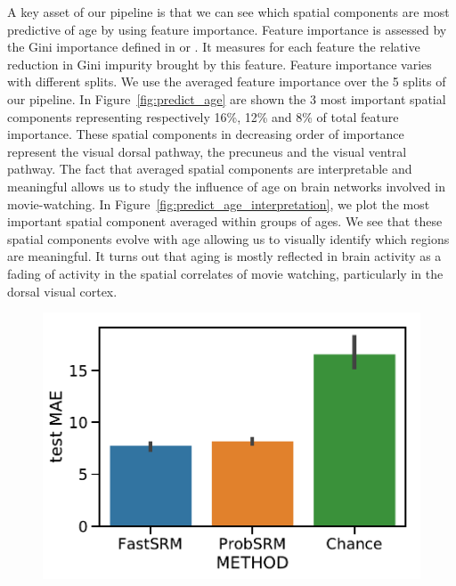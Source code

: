 \documentclass{report}
\begin{document}
{A key asset of our pipeline is that we can see which spatial components are most predictive of age by using feature importance.
%
Feature importance is assessed by the Gini importance defined in \cite{breiman2001random} or \cite{louppe2013understanding}.
%
It measures for each feature the relative reduction in Gini impurity brought by this feature.
%
Feature importance varies with different splits. We use the averaged feature importance over the 5 splits of our pipeline.
%
In Figure~\ref{fig:predict_age} are shown the 3 most important spatial components representing respectively 16\%, 12\% and 8\% of total feature importance.
%
These spatial components in decreasing order of importance represent the visual dorsal pathway, the precuneus and the visual ventral pathway. 
%
The fact that averaged spatial components are interpretable and meaningful allows us to study the influence of age on brain networks involved in movie-watching.
%
In Figure~\ref{fig:predict_age_interpretation}, we plot the most important spatial component averaged within groups of ages.
%
We see that these spatial components evolve with age allowing us to visually identify which regions are meaningful. 
%
It turns out that aging is mostly reflected in brain activity as a
fading of activity in the spatial correlates of movie watching,
particularly in the dorsal visual cortex.
%


\begin{figure}
\centering
\includegraphics[scale=0.44]{figures/srm/predict_age.pdf}


\end{figure}}
\end{document}

